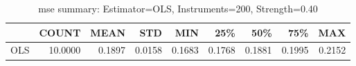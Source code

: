 \begin{table}[ht]
\centering
\caption{mse summary: Estimator=OLS, Instruments=200, Strength=0.40}
\begin{tabular}{lrrrrrrrr}
\toprule
 & COUNT & MEAN & STD & MIN & 25\% & 50\% & 75\% & MAX \\
\midrule
OLS & 10.0000 & 0.1897 & 0.0158 & 0.1683 & 0.1768 & 0.1881 & 0.1995 & 0.2152 \\
\bottomrule
\end{tabular}
\end{table}

